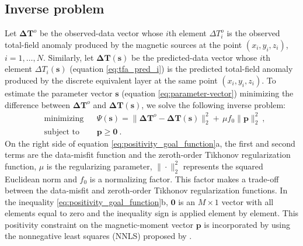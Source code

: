 \subsection{Inverse problem}

Let $\mathbf{\Delta T}^{o}$ be the observed-data vector whose $i$th element $\Delta T_{i}^{o}$
is the observed total-field anomaly produced by the magnetic sources at the point 
$(x_{i},y_{i},z_{i})$, $i = 1, \dots, N$. 
Similarly, let $\mathbf{\Delta T} (\mathbf{s})$ be the predicted-data vector whose $i$th element 
$\Delta T_{i}(\mathbf{s})$ (equation \ref{eq:tfa_pred_i}) is the predicted total-field anomaly  
produced by the discrete equivalent layer at the same point $(x_{i},y_{i},z_{i})$. 
To estimate the parameter vector $\mathbf{s}$ (equation \ref{eq:parameter-vector})
minimizing the difference between $\mathbf{\Delta T}^{o}$ and 
$\mathbf{\Delta T}(\mathbf{s})$, we solve the following inverse problem:
\begin{subequations}
	\begin{align}
	& \text{minimizing}
	& &\Psi(\mathbf{s}) =\lVert \mathbf{\Delta T}^{o} - \mathbf{\Delta T} (\mathbf{s}) 
	\rVert_{2}^{2} + \, \mu f_0 \parallel \mathbf{p} \parallel_{2}^{2} \: , \\
	& \text{subject to}
	& & \mathbf{p} \geqslant \mathbf{0} \: .
	\end{align}
	\label{eq:positivity_goal_function}
\end{subequations}
On the right side of equation \ref{eq:positivity_goal_function}a, the first 
and second terms are 
the data-misfit function and the zeroth-order Tikhonov regularization 
function, $\mu$ is the regularizing parameter, $\| \cdot \|_{2}^{2}$ represents 
the squared Euclidean norm and $f_0$ is a normalizing factor. 
This factor makes a trade-off 
between the data-misfit and zeroth-order Tikhonov regularization functions.
In the inequality \ref{eq:positivity_goal_function}b, $\mathbf{0}$ is an 
$M \times 1$ vector with all elements equal to zero and the inequality sign 
is applied element 
by element. This positivity constraint on the magnetic-moment vector $\mathbf{p}$ 
is incorporated by using the nonnegative least squares (NNLS) proposed by 
\cite{lawson_hanson_1974}. 


